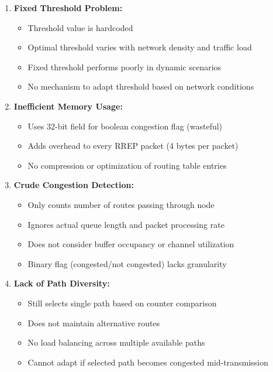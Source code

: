 \documentclass[12pt,a4paper]{article}
\begin{document}
\begin{enumerate}
    \item \textbf{Fixed Threshold Problem:}
    \begin{itemize}
        \item Threshold value is hardcoded 
        \item Optimal threshold varies with network density and traffic load
        \item Fixed threshold performs poorly in dynamic scenarios
        \item No mechanism to adapt threshold based on network conditions
    \end{itemize}
    
    \item \textbf{Inefficient Memory Usage:}
    \begin{itemize}
        \item Uses 32-bit field for boolean congestion flag (wasteful)
        \item Adds overhead to every RREP packet (4 bytes per packet)
        \item No compression or optimization of routing table entries
    \end{itemize}
    
    \item \textbf{Crude Congestion Detection:}
    \begin{itemize}
        \item Only counts number of routes passing through node
        \item Ignores actual queue length and packet processing rate
        \item Does not consider buffer occupancy or channel utilization
        \item Binary flag (congested/not congested) lacks granularity
    \end{itemize}
    
    \item \textbf{Lack of Path Diversity:}
    \begin{itemize}
        \item Still selects single path based on counter comparison
        \item Does not maintain alternative routes
        \item No load balancing across multiple available paths
        \item Cannot adapt if selected path becomes congested mid-transmission
    \end{itemize}
    

\end{enumerate}
\end{document}
